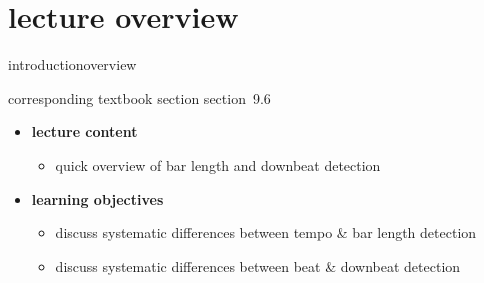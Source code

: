 


\subtitle{module 9.6: downbeat and bar length detection}


	

    \section[overview]{lecture overview}
        \begin{frame}{introduction}{overview}
            \begin{block}{corresponding textbook section}
                    section~9.6
            \end{block}

            \begin{itemize}
                \item   \textbf{lecture content}
                    \begin{itemize}
                        \item   quick overview of bar length and downbeat detection
                    \end{itemize}
                \bigskip
                \item<2->   \textbf{learning objectives}
                    \begin{itemize}
                        \item   discuss systematic differences between tempo \& bar length detection
                        \item   discuss systematic differences between beat \& downbeat detection
                    \end{itemize}
            \end{itemize}
        \end{frame}

